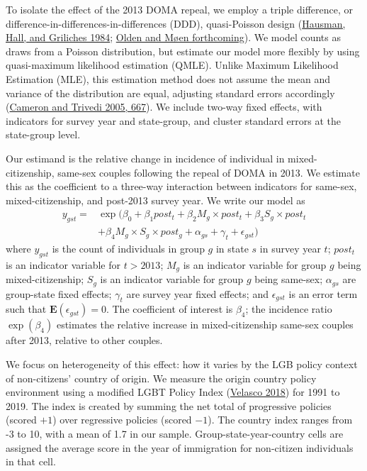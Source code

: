 \documentclass[
  12pt,
]{article}
\begin{document}
To isolate the effect of the 2013 DOMA repeal, we employ a triple difference, or difference-in-differences-in-differences (DDD), quasi-Poisson design (\protect\hyperlink{ref-hausman_1984_econometric}{Hausman, Hall, and Griliches 1984}; \protect\hyperlink{ref-olden_forthcoming_triple}{Olden and Møen forthcoming}). We model counts as draws from a Poisson distribution, but estimate our model more flexibly by using quasi-maximum likelihood estimation (QMLE). Unlike Maximum Likelihood Estimation (MLE), this estimation method does not assume the mean and variance of the distribution are equal, adjusting standard errors accordingly (\protect\hyperlink{ref-cameron_2005_microeconometrics}{Cameron and Trivedi 2005, 667}). We include two-way fixed effects, with indicators for survey year and state-group, and cluster standard errors at the state-group level.

Our estimand is the relative change in incidence of individual in mixed-citizenship, same-sex couples following the repeal of DOMA in 2013. We estimate this as the coefficient to a three-way interaction between indicators for same-sex, mixed-citizenship, and post-2013 survey year. We write our model as
\[\begin{aligned}
y_{gst} = &\exp(\beta_0 + \beta_1 post_t + \beta_2 M_g \times post_t + \beta_3 S_g \times post_t  \\
&+ \beta_4 M_g \times S_g \times post_g + \alpha_{gs} + \gamma_{t} + \epsilon_{gst})
\end{aligned}\]
where \(y_{gst}\) is the count of individuals in group \(g\) in state \(s\) in survey year \(t\); \(post_t\) is an indicator variable for \(t > 2013\); \(M_g\) is an indicator variable for group \(g\) being mixed-citizenship; \(S_g\) is an indicator variable for group \(g\) being same-sex; \(\alpha_{gs}\) are group-state fixed effects; \(\gamma_t\) are survey year fixed effects; and \(\epsilon_{gst}\) is an error term such that \(\mathbf E(\epsilon_{gst}) = 0\). The coefficient of interest is \(\beta_4\); the incidence ratio \(\exp(\beta_4)\) estimates the relative increase in mixed-citizenship same-sex couples after 2013, relative to other couples.

We focus on heterogeneity of this effect: how it varies by the LGB policy context of non-citizens' country of origin. We measure the origin country policy environment using a modified LGBT Policy Index (\protect\hyperlink{ref-velasco_2018}{Velasco 2018}) for 1991 to 2019. The index is created by summing the net total of progressive policies (scored \(+1\)) over regressive policies (scored \(-1\)). The country index ranges from -3 to 10, with a mean of 1.7 in our sample. Group-state-year-country cells are assigned the average score in the year of immigration for non-citizen individuals in that cell.
\end{document}
